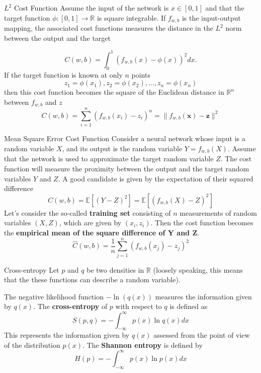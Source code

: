 \documentclass{beamer}
\begin{document}
\begin{frame}{$L^2$ Cost Function}
	Assume the input of the network is $x\in [0,1]$ and that the target function $\phi\colon [0,1] \to \mathbb{R}$ is square integrable. If $f_{w,b}$ is the input-output mapping, the associated cost functions measures the distance in the $L^2$ norm between the output and the target
	
	\begin{equation*}
		C(w,b)= \int_{0}^{1} (f_{w,b}(x)-\phi(x))^2 dx.
	\end{equation*}
	If the target function is known at only $n$ points
		\begin{equation*}
		z_1=\phi(x_1), z_2=\phi(x_2), \ldots, z_n= \phi(x_n)
	\end{equation*}
	then this cost function becomes the square of the Euclidean distance in $\mathbb{R}^n$ between $f_{w,b}$ and $z$
	\begin{equation*}
		C(w,b)=\sum_{i=1}^n (f_{w,b}(x_i)- z_i)^n= \| f_{w,b}(\textbf{x})-\textbf{z}\|^2
	\end{equation*}
\end{frame}

\begin{frame}{Mean Square Error Cost Function}
	Consider a neural network whose input is a random variable $X$, and its output is the random variable $Y=f_{w,b}(X)$. Assume that the network is used to approximate the target random variable $Z$. The cost function will measure the proximity between the output and the target random variables $Y$ and $Z$.  A good candidate is given by the expectation of their squared difference
	\begin{equation*}
		C(w,b)= \mathbb{E}[(Y-Z)^2]= \mathbb{E}[(f_{w,b}(X)-Z)^2]
	\end{equation*}
	Let's consider the so-called \textbf{training set} consisting of $n$ measurements of random variables $(X,Z)$, which are given by $(x_i,z_i)$. Then the cost function becomes the \textbf{empirical mean of the square difference of Y and Z}. 
	\begin{equation*}
		\hat{C}(w,b)=\frac{1}{n} \sum_{j=1}^n (f_{w,b}(x_j)- z_j)^2
	\end{equation*} 
\end{frame}

\begin{frame}{Cross-entropy}
	Let $p$ and $q$ be two densities in $\mathbb{R}$ (loosely speaking, this means that the these functions can describe a random variable).
	
	The negative likelihood function $-\ln(q(x))$ measures the information given by $q(x)$. 
	The \textbf{cross-entropy} of $p$ with respect to $q$ is defined as
	\begin{equation*}
		S(p,q)= - \int_{-\infty}^{\infty} p(x) \ln q(x) dx
	\end{equation*}
	This represents the information given by $q(x)$ assessed from the point of view of the distribution $p(x)$.
	The \textbf{Shannon entropy} is defined by 
	\begin{equation*}
		H(p)= - \int_{-\infty}^{\infty} p(x) \ln p(x) dx
	\end{equation*}
\end{frame}
\end{document}
